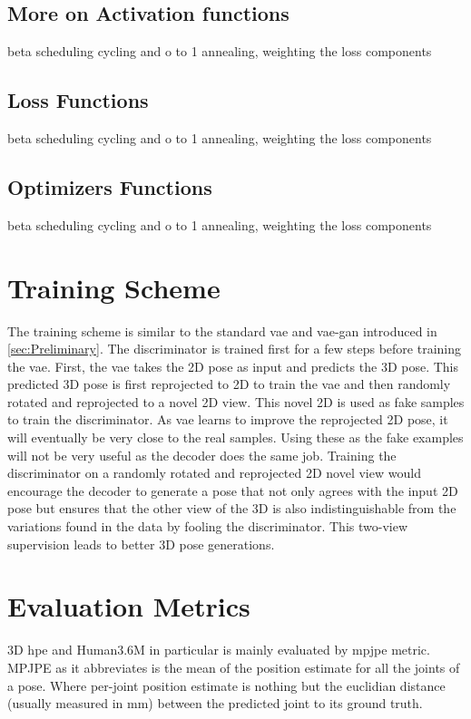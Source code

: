 \subsection{More on Activation functions}
beta scheduling cycling and o to 1 annealing, weighting the loss components

\subsection{Loss Functions}
beta scheduling cycling and o to 1 annealing, weighting the loss components

\subsection{Optimizers Functions}
beta scheduling cycling and o to 1 annealing, weighting the loss components


\section{Training Scheme}
The training scheme is similar to the standard \ac{vae} and \ac{vae}-\ac{gan} introduced in \ref{sec:Preliminary}. The discriminator is trained first for a few steps before training the \ac{vae}. First, the \ac{vae} takes the 2D pose as input and predicts the 3D pose. This predicted 3D pose is first reprojected to 2D to train the \ac{vae} and then randomly rotated and reprojected to a novel 2D view. This novel 2D is used as fake samples to train the discriminator. As \ac{vae} learns to improve the reprojected 2D pose, it will eventually be very close to the real samples. Using these as the fake examples will not be very useful as the decoder does the same job. Training the discriminator on a randomly rotated and reprojected 2D novel view would encourage the decoder to generate a pose that not only agrees with the input 2D pose but ensures that the other view of the 3D is also indistinguishable from the variations found in the data by fooling the discriminator. This two-view supervision leads to better 3D pose generations.


\section{Evaluation Metrics} %
3D \ac{hpe} and Human3.6M in particular is mainly evaluated by \ac{mpjpe} metric. MPJPE as it abbreviates is the mean of the position estimate for all the joints of a pose. Where per-joint position estimate is nothing but the euclidian distance (usually measured in mm) between the predicted joint to its ground truth.


